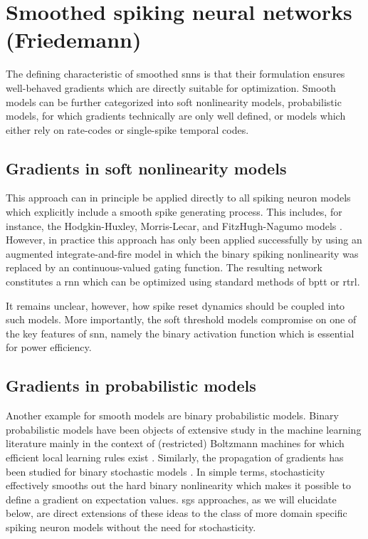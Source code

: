 \documentclass[journal,onecolumn,11pt]{IEEEtran}
\begin{document}
\section{Smoothed spiking neural networks (Friedemann)}

The defining characteristic of smoothed \glspl{snn} is that their formulation ensures well-behaved gradients which are directly suitable for optimization.
Smooth models can be further categorized into soft nonlinearity models, probabilistic models, for which gradients technically are only well defined, or models which either rely on rate-codes or
single-spike temporal codes.  


\subsection{Gradients in soft nonlinearity models}

This approach can in principle be applied
directly to all spiking neuron models which explicitly include a smooth spike
generating process. This includes, for instance,  the Hodgkin-Huxley,
Morris-Lecar, and FitzHugh-Nagumo models \cite{Gerstner_etal14_neurdyna}.
However, in practice this approach has only been applied successfully by
\cite{Huh_Sejnowski17_graddesc} using an augmented integrate-and-fire model in
which the binary spiking nonlinearity was replaced by an continuous-valued
gating function.  The resulting network constitutes a \gls{rnn} which can be
optimized using standard methods of \gls{bptt} or \gls{rtrl}.  

It remains unclear, however, how spike reset dynamics should be coupled into
such models. More importantly, the soft threshold models compromise on one of
the key features of \gls{snn}, namely the binary activation function which is
essential for power efficiency.


\subsection{Gradients in probabilistic models}

Another example for smooth models are binary probabilistic models. 
Binary probabilistic models have been objects of extensive study in the machine
learning literature mainly in the context of (restricted) Boltzmann machines
for which efficient local learning rules exist \cite{ackley_learning_1985}. 
Similarly, the propagation of gradients has been studied for binary stochastic
models \cite{bengio_estimating_2013}. 
In simple terms, stochasticity effectively smooths out the hard binary
nonlinearity which makes it possible to define a gradient on expectation values.
\glspl{sg} approaches, as we will elucidate below, are direct extensions of
these ideas to the class of more domain specific spiking neuron models without
the need for stochasticity.  
\end{document}
